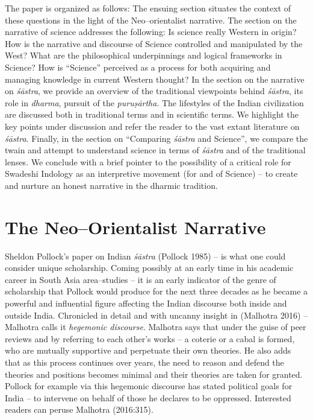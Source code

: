 The paper is organized as follows: The ensuing section situates the context of these questions in the light of the Neo–orientalist narrative. The section on the narrative of science addresses the following: Is science really Western in origin? How is the narrative and discourse of Science controlled and manipulated by the West? What are the philosophical underpinnings and logical frameworks in Science? How is “Science” perceived as a process for both acquiring and managing knowledge in current Western thought? In the section on the narrative on \textit{śāstra}, we provide an overview of the traditional viewpoints behind \textit{śāstra}, its role in \textit{dharma}, pursuit of the \textit{puruṣārtha}. The lifestyles of the Indian civilization are discussed both in traditional terms and in scientific terms. We highlight the key points under discussion and refer the reader to the vast extant literature on \textit{śāstra}. Finally, in the section on “Comparing \textit{śāstra} and Science”, we compare the twain and attempt to understand science in terms of \textit{śāstra} and of the traditional lenses. We conclude with a brief pointer to the possibility of a critical role for Swadeshi Indology as an interpretive movement (for and of Science) – to create and nurture an honest narrative in the dharmic tradition.


\section*{The Neo–Orientalist Narrative}

Sheldon Pollock’s paper on Indian \textit{śāstra} (Pollock 1985) – is what one could consider unique scholarship. Coming possibly at an early time in his academic career in South Asia area–studies – it is an early indicator of the genre of scholarship that Pollock would produce for the next three decades as he became a powerful and influential figure affecting the Indian discourse both inside and outside India. Chronicled in detail and with uncanny insight in (Malhotra 2016) – Malhotra calls it \textit{hegemonic discourse}. Malhotra says that under the guise of peer reviews and by referring to each other’s works – a coterie or a cabal is formed, who are mutually supportive and perpetuate their own theories. He also adds that as this process continues over years, the need to reason and defend the theories and positions becomes minimal and their theories are taken for granted. Pollock for example via this hegemonic discourse has stated political goals for India – to intervene on behalf of those he declares to be oppressed. Interested readers can peruse Malhotra (2016:315).

